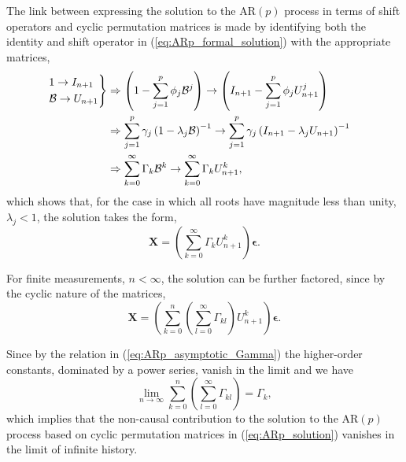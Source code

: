 \documentclass[12pt, twoside, draft]{article}
\begin{document}
The link between expressing the solution to the AR$(p)$ process in terms of shift operators and cyclic permutation matrices is made by identifying both the identity and shift operator in (\ref{eq:ARp_formal_solution}) with the appropriate matrices,
\begin{align}
\begin{rcases}
1 \rightarrow I_{n+1} \\
\mathcal{B} \rightarrow U_{n+1}
\end{rcases} 
&\Rightarrow \left( 1 - \sum_{j=1}^p \phi_j \mathcal{B}^j \right) \rightarrow \left( I_{n+1} - \sum_{j=1}^p \phi_j U_{n+1}^j \right) \notag \\
&\Rightarrow \sum_{j=1}^p \gamma_j \left( 1 - \lambda_j \mathcal{B} \right)^{-1} \rightarrow \sum_{j=1}^p \gamma_j \left( I_{n+1} - \lambda_j U_{n+1} \right)^{-1} \notag \\
&\Rightarrow \sum_{k=0}^\infty \Gamma_k \mathcal{B}^k \rightarrow \sum_{k=0}^\infty \Gamma_k U_{n+1}^k,
\end{align}
which shows that, for the case in which all roots have magnitude less than unity, $\lambda_j < 1$, the solution takes the form,
\begin{equation}\label{eq:ARp_solution}
\mathbf{X} = \left( \sum_{k=0}^\infty \Gamma_k U_{n+1}^k \right) \boldsymbol{\epsilon}.
\end{equation}

For finite measurements, $n < \infty$, the solution can be further factored, since by the cyclic nature of the matrices,
\begin{equation}
\mathbf{X} = \left( \sum_{k=0}^n \left( \sum_{l=0}^\infty \Gamma_{kl} \right) U_{n+1}^k \right) \boldsymbol{\epsilon}.
\end{equation}

Since by the relation in (\ref{eq:ARp_asymptotic_Gamma}) the higher-order constants, dominated by a power series, vanish in the limit and we have
\begin{equation}
\lim_{n \to \infty} \sum_{k=0}^n \left( \sum_{l=0}^\infty \Gamma_{kl} \right) = \Gamma_k,
\end{equation}
which implies that the non-causal contribution to the solution to the AR$(p)$ process based on cyclic permutation matrices in (\ref{eq:ARp_solution}) vanishes in the limit of infinite history.
\end{document}
